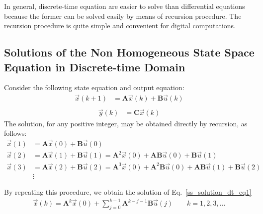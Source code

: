 \documentclass[11pt,a4paper,oneside]{book}
\numberwithin{equation}{section}
\theoremstyle{it}
\theoremstyle{definition}
\begin{document}
In general, discrete-time equation are easier to solve than differential 
equations because the former can be solved easily by means of recursion 
procedure. The recursion procedure is quite simple and convenient for digital 
computations.

\subsection{Solutions of the Non Homogeneous State Space Equation in 
	Discrete-time Domain}
Consider the following state equation and output equation:
\begin{equation}\label{ss_solution_dt_eq1}
\begin{aligned}
		\vec{x}(k+1) &= \mathbf{A}\vec{x}(k) + \mathbf{B}\vec{u}(k) \\[6pt]
	\end{aligned}
\end{equation}
\begin{equation}\label{ss_solution_dt_eq1b}
\begin{aligned}
		\vec{y}(k) &= \mathbf{C}\vec{x}(k)
	\end{aligned}
\end{equation}
The solution, for any positive integer, may be obtained directly by recursion, 
as follows:
\begin{equation}\label{ss_solution_dt_eq2}
	\begin{aligned}
		\vec{x}(1) &= \mathbf{A}\vec{x}(0) + \mathbf{B}\vec{u}(0)\\[6pt]
		\vec{x}(2) &= \mathbf{A}\vec{x}(1) + \mathbf{B}\vec{u}(1) = 
		\mathbf{A}^2\vec{x}(0) + 
		\mathbf{A}\mathbf{B}\vec{u}(0)+\mathbf{B}\vec{u}(1)\\[6pt]
		\vec{x}(3) &= \mathbf{A}\vec{x}(2) + \mathbf{B}\vec{u}(2) = 
		\mathbf{A}^3\vec{x}(0) + 
		\mathbf{A}^2\mathbf{B}\vec{u}(0)+\mathbf{A}\mathbf{B}\vec{u}(1)+\mathbf{B}\vec{u}(2)\\[6pt]
		&\vdots
	\end{aligned}
\end{equation}
\begin{mybox}
	By repeating this procedure, we obtain the solution of 
	Eq.~\eqref{ss_solution_dt_eq1}
	\begin{equation}\label{ss_solution_dt_eq3}
		\begin{aligned}
			\vec{x}(k) = \mathbf{A}^k\vec{x}(0) + 
			\sum_{j=0}^{k-1}\mathbf{A}^{k-j-1}\mathbf{B}\vec{u}(j) \quad \quad 
			k=1,2,3,...
		\end{aligned}
	\end{equation}
\end{mybox}
\end{document}
